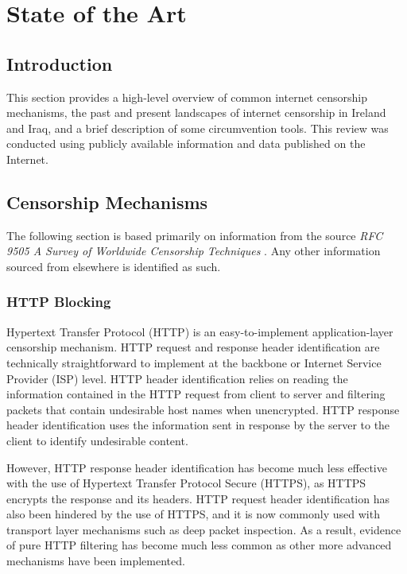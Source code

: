 \chapter{State of the Art}

\section{Introduction}

This section provides a high-level overview of common internet censorship mechanisms, the past and present landscapes of internet censorship in Ireland and Iraq, and a brief description of some circumvention tools. This review was conducted using publicly available information and data published on the Internet.

\section{Censorship Mechanisms}

The following section is based primarily on information from the source \textit{RFC 9505
A Survey of Worldwide Censorship Techniques} \cite{rfc9505}. Any other information sourced from elsewhere is identified as such.

\subsection{HTTP Blocking}

Hypertext Transfer Protocol (HTTP) is an easy-to-implement application-layer censorship mechanism. HTTP request and response header identification are technically straightforward to implement at the backbone or Internet Service Provider (ISP) level. HTTP header identification relies on reading the information contained in the HTTP request from client to server and filtering packets that contain undesirable host names when unencrypted. HTTP response header identification uses the information sent in response by the server to the client to identify undesirable content. 

However, HTTP response header identification has become much less effective with the use of Hypertext Transfer Protocol Secure (HTTPS), as HTTPS encrypts the response and its headers. HTTP request header identification has also been hindered by the use of HTTPS, and it is now commonly used with transport layer mechanisms such as deep packet inspection. As a result, evidence of pure HTTP filtering has become much less common as other more advanced mechanisms have been implemented. 

